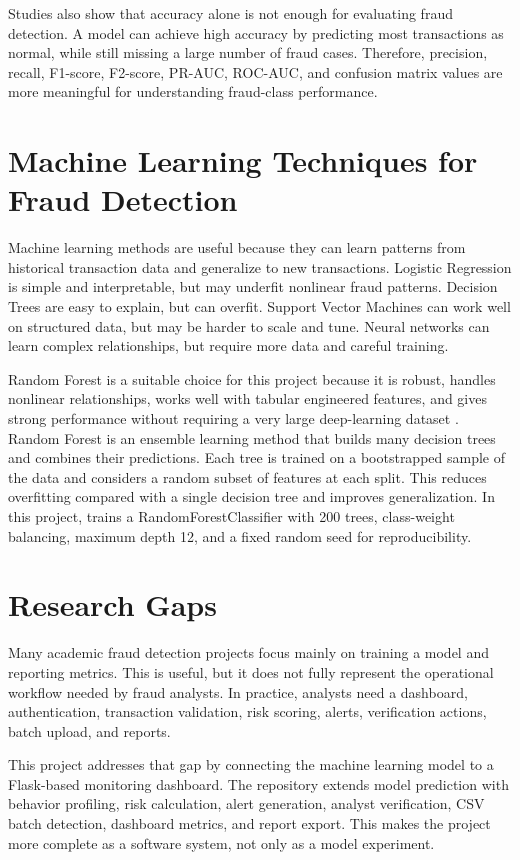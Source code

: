 \documentclass[12pt,a4paper]{report}
\begin{document}
Studies also show that accuracy alone is not enough for evaluating fraud detection. A model can achieve high accuracy by predicting most transactions as normal, while still missing a large number of fraud cases. Therefore, precision, recall, F1-score, F2-score, PR-AUC, ROC-AUC, and confusion matrix values are more meaningful for understanding fraud-class performance.

\section{Machine Learning Techniques for Fraud Detection}
Machine learning methods are useful because they can learn patterns from historical transaction data and generalize to new transactions. Logistic Regression is simple and interpretable, but may underfit nonlinear fraud patterns. Decision Trees are easy to explain, but can overfit. Support Vector Machines can work well on structured data, but may be harder to scale and tune. Neural networks can learn complex relationships, but require more data and careful training.

Random Forest is a suitable choice for this project because it is robust, handles nonlinear relationships, works well with tabular engineered features, and gives strong performance without requiring a very large deep-learning dataset \cite{adesina2024creditcard,mallidi2021analysis}. Random Forest is an ensemble learning method that builds many decision trees and combines their predictions. Each tree is trained on a bootstrapped sample of the data and considers a random subset of features at each split. This reduces overfitting compared with a single decision tree and improves generalization. In this project,  trains a RandomForestClassifier with 200 trees, class-weight balancing, maximum depth 12, and a fixed random seed for reproducibility.

\section{Research Gaps}
Many academic fraud detection projects focus mainly on training a model and reporting metrics. This is useful, but it does not fully represent the operational workflow needed by fraud analysts. In practice, analysts need a dashboard, authentication, transaction validation, risk scoring, alerts, verification actions, batch upload, and reports.

This project addresses that gap by connecting the machine learning model to a Flask-based monitoring dashboard. The repository extends model prediction with behavior profiling, risk calculation, alert generation, analyst verification, CSV batch detection, dashboard metrics, and report export. This makes the project more complete as a software system, not only as a model experiment.
\end{document}
